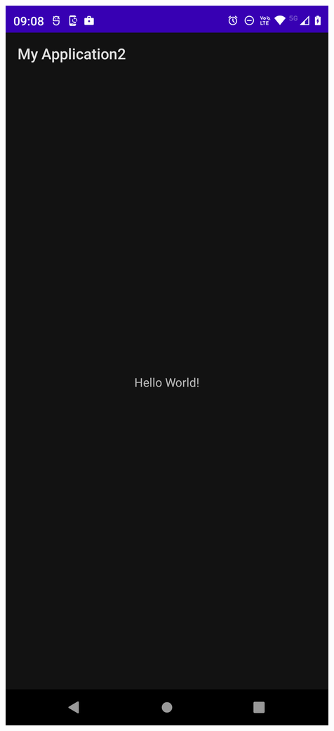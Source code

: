\begin{frame}
\begin{columns}
\begin{center}
\includegraphics[width=0.95\linewidth]{00_Configurar/Etapa1_fase1.png}    
\end{center}
\end{columns} 
\end{frame}

